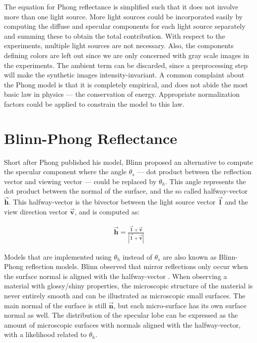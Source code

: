 
The equation for Phong reflectance is simplified such that it does not involve more than one light source. More light sources could be incorporated easily by computing the diffuse and specular components for each light source separately and summing these to obtain the total contribution. With respect to the experiments, multiple light sources are not necessary. Also, the components defining colors are left out since we are only concerned with gray scale images in the experiments. The ambient term can be discarded, since a preprocessing step will make the synthetic images intensity-invariant. A common complaint about the Phong model is that it is completely empirical, and does not abide the most basic law in physics --- the conservation of energy. Appropriate normalization factors could be applied to constrain the model to this law.

	\section{Blinn-Phong Reflectance}\label{sec:BlinnPhong}
		Short after Phong published his model, Blinn \cite{Blinn} proposed an alternative to compute the specular component where the angle $\theta_s$ --- dot product between the reflection vector and viewing vector --- could be replaced by $\theta_h$. This angle represents the dot product between the normal of the surface, and the so called halfway-vector $\vec{\mathbf{h}}$. This halfway-vector is the bivector between the light source vector $\vec{\mathbf{l}}$ and the view direction vector $\vec{\mathbf{v}}$, and is computed as:

	\begin{eqnarray*}
		\vec{\mathbf{h}} = \frac{\vec{\mathbf{l}} + \vec{\mathbf{v}}}{|\vec{\mathbf{l}} + \vec{\mathbf{v}}|}
	\end{eqnarray*}

Models that are implemented using $\theta_h$ instead of $\theta_s$ are also known as Blinn-Phong reflection models. Blinn observed that mirror reflections only occur when the surface normal is aligned with the halfway-vector \cite{DigitalModeling}. When observing a material with glossy/shiny properties, the microscopic structure of the material is never entirely smooth and can be illustrated as microscopic small surfaces. The main normal of the surface is still $\vec{\mathbf{n}}$, but each micro-surface has its own surface normal as well. The distribution of the specular lobe can be expressed as the amount of microscopic surfaces with normals aligned with the halfway-vector, with a likelihood related to $\theta_h$.

